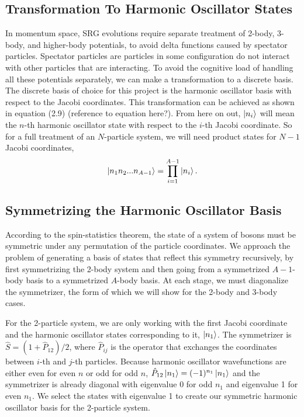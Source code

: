 \subsection{Transformation To Harmonic Oscillator States}

In momentum space, SRG evolutions require separate treatment of 2-body, 3-body, and higher-body potentials, to avoid delta functions caused by spectator particles. Spectator particles are particles in some configuration do not interact with other particles that are interacting. To avoid the cognitive load of handling all these potentials separately, we can make a transformation to a discrete basis. The discrete basis of choice for this project is the harmonic oscillator basis with respect to the Jacobi coordinates. This transformation can be achieved as shown in equation (2.9) (reference to equation here?). From here on out, $\ket{n_i}$ will mean the $n$-th harmonic oscillator state with respect to the $i$-th Jacobi coordinate. So for a full treatment of an $N$-particle system, we will need product states for $N-1$ Jacobi coordinates,
\begin{equation}
\ket{n_1 n_2 ... n_{A-1}} = \prod_{i=1}^{A-1}\ket{n_i}.
\end{equation}

\subsection{Symmetrizing the Harmonic Oscillator Basis}

According to the spin-statistics theorem, the state of a system of bosons must be symmetric under any permutation of the particle coordinates. We approach the problem of generating a basis of states that reflect this symmetry recursively, by first symmetrizing the 2-body system and then going from a symmetrized $A-1$-body basis to a symmetrized $A$-body basis. At each stage, we must diagonalize the symmetrizer, the form of which we will show for the 2-body and 3-body cases.

For the 2-particle system, we are only working with the first Jacobi coordinate and the harmonic oscillator states corresponding to it, $\ket{n_1}$. The symmetrizer is $\hat{S} = (1 + \hat{P}_{12})/2$, where $\hat{P}_{ij}$ is the operator that exchanges the coordinates between $i$-th and $j$-th particles. Because harmonic oscillator wavefunctions are either even for even $n$ or odd for odd $n$, $\hat{P}_{12} \ket{n_1} = (-1)^{n_1} \ket{n_1}$ and the symmetrizer is already diagonal with eigenvalue 0 for odd $n_1$ and eigenvalue 1 for even $n_1$. We select the states with eigenvalue 1 to create our symmetric harmonic oscillator basis for the 2-particle system.

